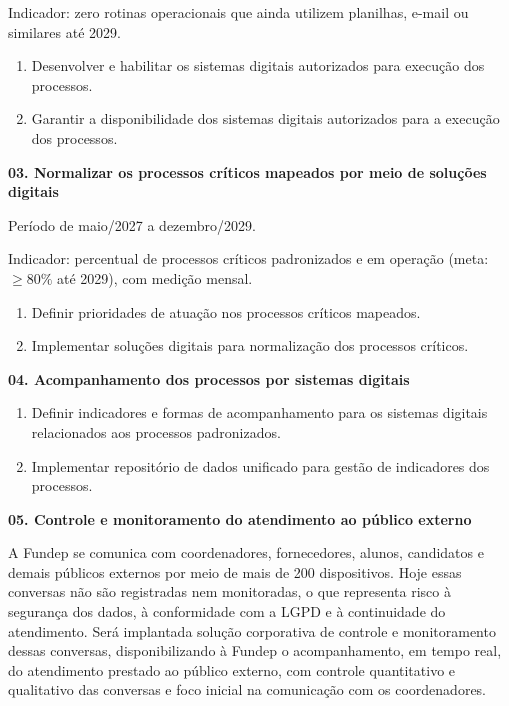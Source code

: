 \documentclass[12pt,a4paper]{article}
\newcommand{\atividade}[1]{%
  \par\vspace{\dimexpr16pt-\parskip\relax}%
  {\bfseries\color{azulAtividade}#1}%
  \par\vspace{\dimexpr8pt-\parskip\relax}%
}
\begin{document}
Indicador: zero rotinas operacionais que ainda utilizem planilhas, e-mail ou similares até 2029.

\begin{enumerate}
  \item Desenvolver e habilitar os sistemas digitais autorizados para execução dos processos.
  \item Garantir a disponibilidade dos sistemas digitais autorizados para a execução dos processos.
\end{enumerate}

\atividade{03. Normalizar os processos críticos mapeados por meio de soluções digitais}

Período de maio/2027 a dezembro/2029.

Indicador: percentual de processos críticos padronizados e em operação (meta: $\geq 80\%$ até 2029), com medição mensal.

\begin{enumerate}
  \item Definir prioridades de atuação nos processos críticos mapeados.
  \item Implementar soluções digitais para normalização dos processos críticos.
\end{enumerate}

\atividade{04. Acompanhamento dos processos por sistemas digitais}

\begin{enumerate}
  \item Definir indicadores e formas de acompanhamento para os sistemas digitais relacionados aos processos padronizados.
  \item Implementar repositório de dados unificado para gestão de indicadores dos processos.
\end{enumerate}

\atividade{05. Controle e monitoramento do atendimento ao público externo}

A Fundep se comunica com coordenadores, fornecedores, alunos, candidatos e demais públicos externos por meio de mais de 200 dispositivos. Hoje essas conversas não são registradas nem monitoradas, o que representa risco à segurança dos dados, à conformidade com a LGPD e à continuidade do atendimento. Será implantada solução corporativa de controle e monitoramento dessas conversas, disponibilizando à Fundep o acompanhamento, em tempo real, do atendimento prestado ao público externo, com controle quantitativo e qualitativo das conversas e foco inicial na comunicação com os coordenadores.
\end{document}
